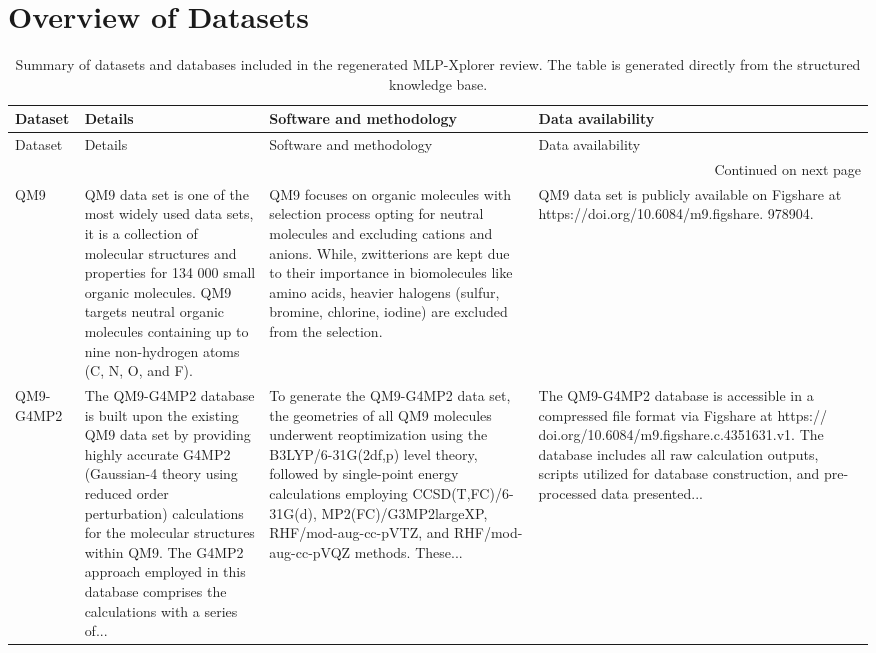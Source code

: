 \documentclass[12pt]{article}
\begin{document}
\section{Overview of Datasets}
\small
\begin{longtable}{p{}p{}p{}p{}}
\caption{Summary of datasets and databases included in the regenerated MLP-Xplorer review. The table is generated directly from the structured knowledge base.}\\
\toprule
Dataset & Details & Software and methodology & Data availability\\
\midrule
\endfirsthead
\toprule
Dataset & Details & Software and methodology & Data availability\\
\midrule
\endhead
\midrule
\multicolumn{4}{r}{Continued on next page}\\
\midrule
\endfoot
\bottomrule
\endlastfoot
QM9 \cite{ds1-1} & QM9 data set is one of the most widely used data sets, it is a collection of molecular structures and properties for 134 000 small organic molecules. QM9 targets neutral organic molecules containing up to nine non-hydrogen atoms (C, N, O, and F). & QM9 focuses on organic molecules with selection process opting for neutral molecules and excluding cations and anions. While, zwitterions are kept due to their importance in biomolecules like amino acids, heavier halogens (sulfur, bromine, chlorine, iodine) are excluded from the selection. & QM9 data set is publicly available on Figshare at https://doi.org/10.6084/m9.figshare. 978904. \cite{ds1-1} \\
QM9-G4MP2 \cite{ds2-36} & The QM9-G4MP2 database is built upon the existing QM9 data set by providing highly accurate G4MP2 (Gaussian-4 theory using reduced order perturbation) calculations for the molecular structures within QM9. The G4MP2 approach employed in this database comprises the calculations with a series of... & To generate the QM9-G4MP2 data set, the geometries of all QM9 molecules underwent reoptimization using the B3LYP/6-31G(2df,p) level theory, followed by single-point energy calculations employing CCSD(T,FC)/6-31G(d), MP2(FC)/G3MP2largeXP, RHF/mod-aug-cc-pVTZ, and RHF/mod-aug-cc-pVQZ methods. These... & The QM9-G4MP2 database is accessible in a compressed file format via Figshare at https:// doi.org/10.6084/m9.figshare.c.4351631.v1. The database includes all raw calculation outputs, scripts utilized for database construction, and pre-processed data presented... \cite{ds2-63} \\

\end{longtable}
\end{document}
